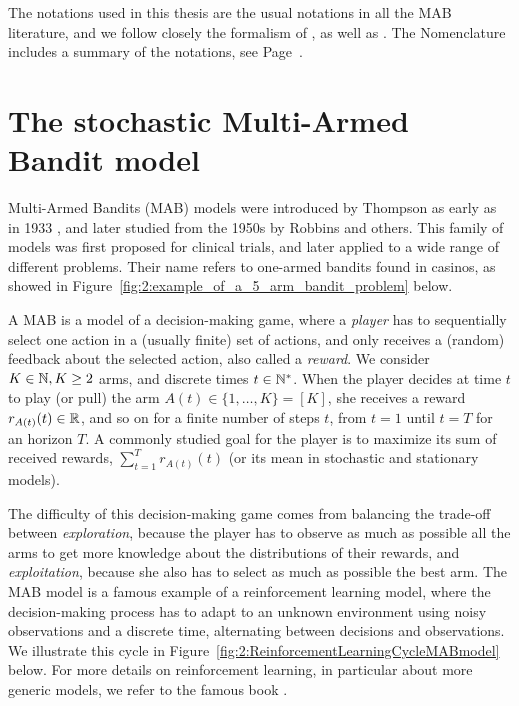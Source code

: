The notations used in this thesis are the usual notations in all the MAB literature, and we follow closely the formalism of \cite{Kaufmann12PhD}, as well as \cite{Slivkins2019,LattimoreBanditAlgorithmsBook,Bubeck12}.
The Nomenclature includes a summary of the notations, see Page~\pageref{chapter:nomenclature}.




\section{The stochastic Multi-Armed Bandit model}
\label{sec:2:notations}


Multi-Armed Bandits (MAB) models were introduced by Thompson as early as in 1933 \cite{Thompson33}, and later studied from the 1950s by Robbins \cite{Robbins52} and others.
This family of models was first proposed for clinical trials, and later applied to a wide range of different problems.
Their name refers to one-armed bandits found in casinos, as showed in Figure~\ref{fig:2:example_of_a_5_arm_bandit_problem} below.


A MAB is a model of a decision-making game, where a \emph{player} has to sequentially select one action in a (usually finite) set of actions, and only receives a (random) feedback about the selected action, also called a \emph{reward}.
We consider $K\in\mathbb{N}, K\geq2$ arms, and discrete times $t\in\mathbb{N}^*$.
When the player decides at time $t$ to play (or pull) the arm $A(t)\in\{1,\dots,K\}=[K]$, she receives a reward $r_{A(t)}(t)\in\mathbb{R}$, and so on for a finite number of steps $t$, from $t=1$ until $t=T$ for an horizon $T$.
%
A commonly studied goal for the player is to maximize its sum of received rewards, $\sum_{t=1}^T r_{A(t)}(t)$
(or its mean in stochastic and stationary models).


The difficulty of this decision-making game comes from balancing the trade-off between \emph{exploration}, because the player has to observe as much as possible all the arms to get more knowledge about the distributions of their rewards, and \emph{exploitation}, because she also has to select as much as possible the best arm.
The MAB model is a famous example of a reinforcement learning model, where the decision-making process has to adapt to an unknown environment using noisy observations and a discrete time, alternating between decisions and observations.
We illustrate this cycle in Figure~\ref{fig:2:ReinforcementLearningCycleMABmodel} below.
For more details on reinforcement learning, in particular about more generic models, we refer to the famous book \cite{SuttonBarto2018}.


